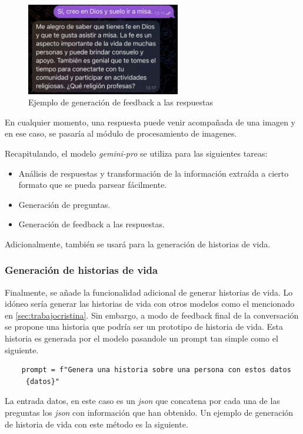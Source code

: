 \begin{figure}[h]
	\centering
	\includegraphics[width=0.6\textwidth]{Imagenes/feedback}
	\caption{Ejemplo de generación de feedback a las respuestas}
	\label{fig:feedback}
\end{figure}


En cualquier momento, una respuesta puede venir acompañada de una imagen y en ese caso, se pasaría al módulo de procesamiento de imagenes.

Recapitulando, el modelo \textit{gemini-pro} se utiliza para las siguientes tareas: 
\begin{itemize}
	\item Análisis de respuestas y transformación de la información extraída a cierto formato que se pueda parsear fácilmente.
	\item Generación de preguntas.
	\item Generación de feedback a las respuestas.
\end{itemize}

Adicionalmente, también se usará para la generación de historias de vida.

\subsubsection{Generación de historias de vida}
Finalmente, se añade la funcionalidad adicional de generar historias de vida. Lo idóneo sería generar las historias de vida con otros modelos como el mencionado en \ref{sec:trabajocristina}. Sin embargo, a modo de feedback final de la conversación se propone una historia que podría ser un prototipo de historia de vida. Esta historia es generada por el modelo pasandole un prompt tan simple como el siguiente. 

\begin{verbatim}
	prompt = f"Genera una historia sobre una persona con estos datos
	 {datos}"
\end{verbatim}

La entrada datos, en este caso es un \textit{json} que concatena por cada una de las preguntas los \textit{json} con información que han obtenido. Un ejemplo de generación de historia de vida con este método es la siguiente. 

